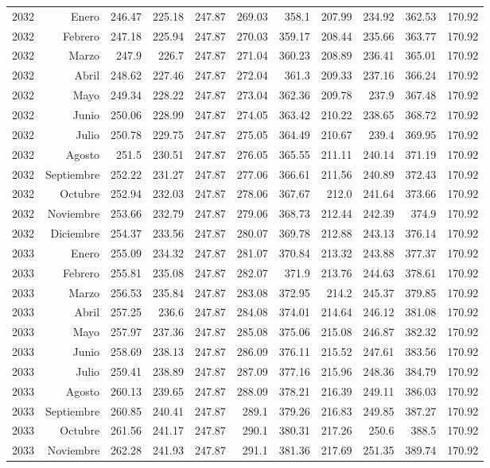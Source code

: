 \documentclass{article}%
\begin{document}
\begin{longtable}{|l r|r|r|r|r|r|r|r|r|r|}
2032&Enero&246.47&225.18&247.87&269.03&358.1&207.99&234.92&362.53&170.92\\%
2032&Febrero&247.18&225.94&247.87&270.03&359.17&208.44&235.66&363.77&170.92\\%
2032&Marzo&247.9&226.7&247.87&271.04&360.23&208.89&236.41&365.01&170.92\\%
2032&Abril&248.62&227.46&247.87&272.04&361.3&209.33&237.16&366.24&170.92\\%
2032&Mayo&249.34&228.22&247.87&273.04&362.36&209.78&237.9&367.48&170.92\\%
2032&Junio&250.06&228.99&247.87&274.05&363.42&210.22&238.65&368.72&170.92\\%
2032&Julio&250.78&229.75&247.87&275.05&364.49&210.67&239.4&369.95&170.92\\%
2032&Agosto&251.5&230.51&247.87&276.05&365.55&211.11&240.14&371.19&170.92\\%
2032&Septiembre&252.22&231.27&247.87&277.06&366.61&211.56&240.89&372.43&170.92\\%
2032&Octubre&252.94&232.03&247.87&278.06&367.67&212.0&241.64&373.66&170.92\\%
2032&Noviembre&253.66&232.79&247.87&279.06&368.73&212.44&242.39&374.9&170.92\\%
2032&Diciembre&254.37&233.56&247.87&280.07&369.78&212.88&243.13&376.14&170.92\\%
2033&Enero&255.09&234.32&247.87&281.07&370.84&213.32&243.88&377.37&170.92\\%
2033&Febrero&255.81&235.08&247.87&282.07&371.9&213.76&244.63&378.61&170.92\\%
2033&Marzo&256.53&235.84&247.87&283.08&372.95&214.2&245.37&379.85&170.92\\%
2033&Abril&257.25&236.6&247.87&284.08&374.01&214.64&246.12&381.08&170.92\\%
2033&Mayo&257.97&237.36&247.87&285.08&375.06&215.08&246.87&382.32&170.92\\%
2033&Junio&258.69&238.13&247.87&286.09&376.11&215.52&247.61&383.56&170.92\\%
2033&Julio&259.41&238.89&247.87&287.09&377.16&215.96&248.36&384.79&170.92\\%
2033&Agosto&260.13&239.65&247.87&288.09&378.21&216.39&249.11&386.03&170.92\\%
2033&Septiembre&260.85&240.41&247.87&289.1&379.26&216.83&249.85&387.27&170.92\\%
2033&Octubre&261.56&241.17&247.87&290.1&380.31&217.26&250.6&388.5&170.92\\%
2033&Noviembre&262.28&241.93&247.87&291.1&381.36&217.69&251.35&389.74&170.92\\%

\end{longtable}
\end{document}
